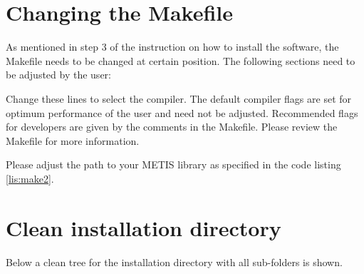 \section{Changing the Makefile}
\label{subsec:changeMake}
    As mentioned in step 3 of the instruction on how to install the software, the Makefile needs to be changed at certain position. The following sections need to be adjusted by the user:
    
    
    Change these lines to select the compiler. The default compiler flags are set for optimum performance of the user and need not be adjusted. Recommended flags for developers are given by the comments in the Makefile. Please review the Makefile for more information.
    
    Please adjust the path to your METIS library as specified in the code listing \ref{lis:make2}.
    
\newpage
\section{Clean installation directory}
\label{sec:cleansimdirc}
Below a clean tree for the installation directory with all sub-folders is shown.

